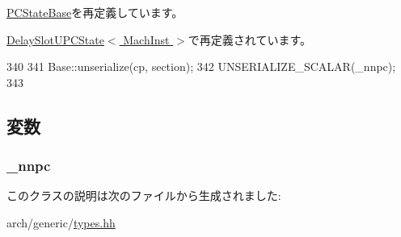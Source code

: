 \hyperlink{classGenericISA_1_1PCStateBase_af22e5d6d660b97db37003ac61ac4ee49}{PCStateBase}を再定義しています。

\hyperlink{classGenericISA_1_1DelaySlotUPCState_af22e5d6d660b97db37003ac61ac4ee49}{DelaySlotUPCState$<$ MachInst $>$}で再定義されています。


\begin{DoxyCode}
340     {
341         Base::unserialize(cp, section);
342         UNSERIALIZE_SCALAR(_nnpc);
343     }
\end{DoxyCode}


\subsection{変数}
\hypertarget{classGenericISA_1_1DelaySlotPCState_a00ba864f85426f814e862055643f861f}{
\subsubsection[{\_\-nnpc}]{ {\bf \_\-nnpc}}}
\label{classGenericISA_1_1DelaySlotPCState_a00ba864f85426f814e862055643f861f}


このクラスの説明は次のファイルから生成されました:\begin{DoxyCompactItemize}
\item 
arch/generic/\hyperlink{arch_2generic_2types_8hh}{types.hh}\end{DoxyCompactItemize}
